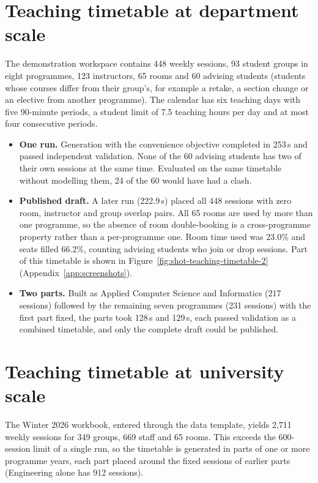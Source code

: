 \section{Teaching timetable at department scale}\label{evidence-department}
The demonstration workspace contains 448 weekly sessions, 93 student groups in eight programmes, 123 instructors, 65 rooms and 60 advising students (students whose courses differ from their group's, for example a retake, a section change or an elective from another programme). The calendar has six teaching days with five 90-minute periods, a student limit of 7.5 teaching hours per day and at most four consecutive periods.

\begin{itemize}
\tightlist
\item \textbf{One run.} Generation with the convenience objective completed in 253\,s and passed independent validation. None of the 60 advising students has two of their own sessions at the same time. Evaluated on the same timetable without modelling them, 24 of the 60 would have had a clash.
\item \textbf{Published draft.} A later run (222.9\,s) placed all 448 sessions with zero room, instructor and group overlap pairs. All 65 rooms are used by more than one programme, so the absence of room double-booking is a cross-programme property rather than a per-programme one. Room time used was 23.0\% and seats filled 66.2\%, counting advising students who join or drop sessions. Part of this timetable is shown in Figure~\ref{fig:shot-teaching-timetable-2} (Appendix~\ref{app:screenshots}).
\item \textbf{Two parts.} Built as Applied Computer Science and Informatics (217 sessions) followed by the remaining seven programmes (231 sessions) with the first part fixed, the parts took 128\,s and 129\,s, each passed validation as a combined timetable, and only the complete draft could be published.
\end{itemize}

\section{Teaching timetable at university scale}\label{evidence-university}
The Winter 2026 workbook, entered through the data template, yields 2{,}711 weekly sessions for 349 groups, 669 staff and 65 rooms. This exceeds the 600-session limit of a single run, so the timetable is generated in parts of one or more programme years, each part placed around the fixed sessions of earlier parts (Engineering alone has 912 sessions).

